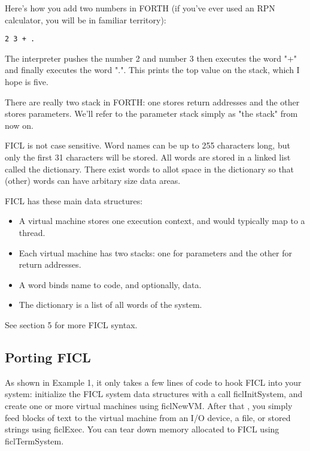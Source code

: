 Here's how you add two numbers in FORTH (if you've ever used an RPN
calculator, you will be in familiar territory):
\begin{lstlisting}[frame=single]
2 3 + .
\end{lstlisting}
The interpreter pushes the number 2 and number 3 then executes the word
"+" and finally executes the word ".". This prints the top value on the
stack, which I hope is five.

There are really two stack in FORTH: one stores return addresses and the
other stores parameters. We'll refer to the parameter stack simply as
"the stack" from now on.

FICL is not case sensitive. Word names can be up to 255 characters long,
but only the first 31 characters will be stored. All words are stored in
a linked list called the dictionary. There exist words to allot space in
the dictionary so that (other) words can have arbitary size data areas.

FICL has these main data structures:
\begin{itemize}[noitemsep]
	\item A virtual machine stores one execution context, and would
	typically map to a thread.

	\item Each virtual machine has two stacks: one for parameters
	and the other for return addresses.

	\item A word binds name to code, and optionally, data.

	\item The dictionary is a list of all words of the system.
\end{itemize}
See section 5 for more FICL syntax.


\subsection{Porting FICL}
As shown in Example 1, it only takes a few lines of code to hook FICL
into your system: initialize the FICL system data structures with a call
ficlInitSystem, and create one or more virtual machines using ficlNewVM.
After that , you simply feed blocks of text to the virtual machine from
an I/O device, a file, or stored strings using ficlExec. You can tear
down memory allocated to FICL using ficlTermSystem.

